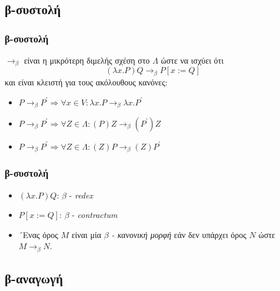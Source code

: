 \documentclass{beamer}
\begin{document}
\subsection{β-συστολή}

\begin{frame}
  \frametitle{β-συστολή}
  $\rightarrow _\beta$ είναι η μικρότερη διμελής σχέση στο $\Lambda$
  ώστε να ισχύει ότι $$(\lambda x . P)Q \rightarrow _\beta P[x:=Q]$$
  και είναι κλειστή για τους ακόλουθους κανόνες:
  \begin{itemize}
  \item $P \rightarrow _\beta P^{\prime} \Rightarrow \forall x \in V
    : \lambda x . P \rightarrow _\beta \lambda x .  P^{\prime}$
  \item $P \rightarrow _\beta P^{\prime} \Rightarrow \forall Z \in
    \Lambda : (P)Z \rightarrow _\beta (P^{\prime})Z$
  \item $P \rightarrow _\beta P^{\prime} \Rightarrow \forall Z \in
    \Lambda : (Z)P \rightarrow _\beta (Z)P^{\prime}$
  \end{itemize}
\end{frame}

\begin{frame}
  \frametitle{β-συστολή}
  \begin{itemize}
  \item $(\lambda x . P)Q$: $\beta$ - \textit{redex}
  \item $P[x:=Q]$: $\beta$ - \textit{contractum}
  \item ´Ενας όρος $M$ είναι μία \textit{$\beta$ - κανονική μορφή} εάν
    δεν υπάρχει όρος $N$ ώστε $M \rightarrow _\beta N$.
  \end{itemize}
\end{frame}

\subsection{β-αναγωγή}
\end{document}
